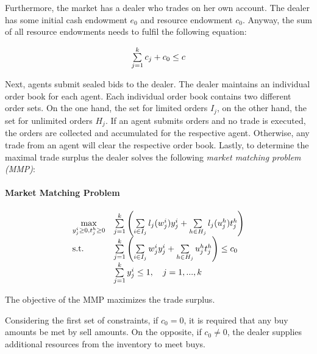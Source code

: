 Furthermore, the market has a dealer who trades on her own account. 
The dealer has some initial cash endowment $e_{0}$ and resource endowment $c_{0}$.
Anyway, the sum of all resource endowments needs to fulfil the following equation:

\begin{equation*}
 \begin{array}{ll@{}ll}
 \sum\limits_{j=1}^{k} c_{j} + c_{0} \leq c
 \end{array}
\end{equation*}

Next, agents submit sealed bids to the dealer. The dealer maintains an individual order book for each agent. Each individual order book contains two different order sets. On the one hand, the set for limited orders $I_{j}$,
on the other hand, the set for unlimited orders $H_{j}$.
If an agent submits orders and no trade is executed, the orders are collected and accumulated for the respective agent. Otherwise, any trade from an agent will clear the respective order book. 
Lastly, to determine the maximal trade surplus the dealer solves 
the following \textit{market matching problem (MMP)}:

\paragraph*{Market Matching Problem}

\begin{equation}
 \begin{array}{ll@{}ll}
 \underset{y_{j}^{i} \geq 0, t_{j}^{h} \geq 0 }{\text{max}} & 
 \sum\limits_{j=1}^{k}
 \left(\sum\limits_{i \in I_{j}}^{} l_{j}(w_{j}^{i})y_{j}^{i} + 
 \sum\limits_{h \in H_{j}}^{} l_{j}(u_{j}^{h})t_{j}^{h} \right) &\\
 \text{s.t.}
 & \sum\limits_{j=1}^{k}
 \left(\sum\limits_{i \in I_{j}}^{} w_{j}^{i}y_{j}^{i} + 
 \sum\limits_{h \in H_{j}}^{} u_{j}^{h}t_{j}^{h} \right) \leq c_{0} \\
 & \sum\limits_{j=1}^{k} y_{j}^{i} \leq 1, \quad j=1 ,..., k
 \end{array}
\end{equation}

The objective of the MMP maximizes the trade surplus. 

Considering the first set of constraints, if $c_{0} = 0$, it is required that any buy amounts be met by sell amounts. 
On the opposite, if $c_{0} \neq 0$, the dealer supplies additional resources from the inventory
to meet buys. 


